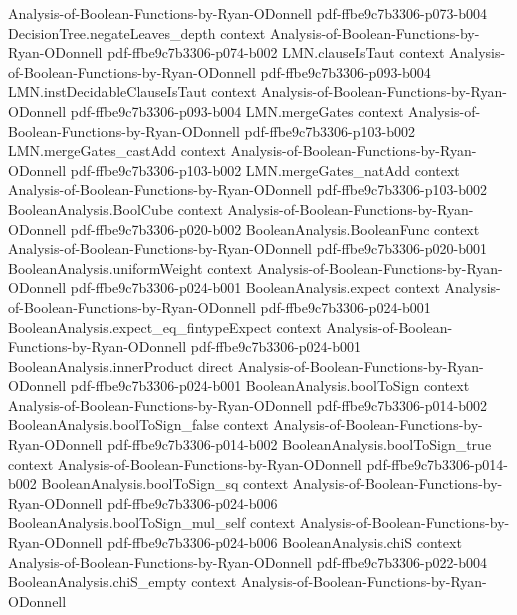 \begin{theorem}
  {Analysis-of-Boolean-Functions-by-Ryan-ODonnell}
  {pdf-ffbe9c7b3306-p073-b004}
\proofstep
  {DecisionTree.negateLeaves_depth}
  {context}
  {Analysis-of-Boolean-Functions-by-Ryan-ODonnell}
  {pdf-ffbe9c7b3306-p074-b002}
\proofstep
  {LMN.clauseIsTaut}
  {context}
  {Analysis-of-Boolean-Functions-by-Ryan-ODonnell}
  {pdf-ffbe9c7b3306-p093-b004}
\proofstep
  {LMN.instDecidableClauseIsTaut}
  {context}
  {Analysis-of-Boolean-Functions-by-Ryan-ODonnell}
  {pdf-ffbe9c7b3306-p093-b004}
\proofstep
  {LMN.mergeGates}
  {context}
  {Analysis-of-Boolean-Functions-by-Ryan-ODonnell}
  {pdf-ffbe9c7b3306-p103-b002}
\proofstep
  {LMN.mergeGates_castAdd}
  {context}
  {Analysis-of-Boolean-Functions-by-Ryan-ODonnell}
  {pdf-ffbe9c7b3306-p103-b002}
\proofstep
  {LMN.mergeGates_natAdd}
  {context}
  {Analysis-of-Boolean-Functions-by-Ryan-ODonnell}
  {pdf-ffbe9c7b3306-p103-b002}
\proofstep
  {BooleanAnalysis.BoolCube}
  {context}
  {Analysis-of-Boolean-Functions-by-Ryan-ODonnell}
  {pdf-ffbe9c7b3306-p020-b002}
\proofstep
  {BooleanAnalysis.BooleanFunc}
  {context}
  {Analysis-of-Boolean-Functions-by-Ryan-ODonnell}
  {pdf-ffbe9c7b3306-p020-b001}
\proofstep
  {BooleanAnalysis.uniformWeight}
  {context}
  {Analysis-of-Boolean-Functions-by-Ryan-ODonnell}
  {pdf-ffbe9c7b3306-p024-b001}
\proofstep
  {BooleanAnalysis.expect}
  {context}
  {Analysis-of-Boolean-Functions-by-Ryan-ODonnell}
  {pdf-ffbe9c7b3306-p024-b001}
\proofstep
  {BooleanAnalysis.expect_eq_fintypeExpect}
  {context}
  {Analysis-of-Boolean-Functions-by-Ryan-ODonnell}
  {pdf-ffbe9c7b3306-p024-b001}
\proofstep
  {BooleanAnalysis.innerProduct}
  {direct}
  {Analysis-of-Boolean-Functions-by-Ryan-ODonnell}
  {pdf-ffbe9c7b3306-p024-b001}
\proofstep
  {BooleanAnalysis.boolToSign}
  {context}
  {Analysis-of-Boolean-Functions-by-Ryan-ODonnell}
  {pdf-ffbe9c7b3306-p014-b002}
\proofstep
  {BooleanAnalysis.boolToSign_false}
  {context}
  {Analysis-of-Boolean-Functions-by-Ryan-ODonnell}
  {pdf-ffbe9c7b3306-p014-b002}
\proofstep
  {BooleanAnalysis.boolToSign_true}
  {context}
  {Analysis-of-Boolean-Functions-by-Ryan-ODonnell}
  {pdf-ffbe9c7b3306-p014-b002}
\proofstep
  {BooleanAnalysis.boolToSign_sq}
  {context}
  {Analysis-of-Boolean-Functions-by-Ryan-ODonnell}
  {pdf-ffbe9c7b3306-p024-b006}
\proofstep
  {BooleanAnalysis.boolToSign_mul_self}
  {context}
  {Analysis-of-Boolean-Functions-by-Ryan-ODonnell}
  {pdf-ffbe9c7b3306-p024-b006}
\proofstep
  {BooleanAnalysis.chiS}
  {context}
  {Analysis-of-Boolean-Functions-by-Ryan-ODonnell}
  {pdf-ffbe9c7b3306-p022-b004}
\proofstep
  {BooleanAnalysis.chiS_empty}
  {context}
  {Analysis-of-Boolean-Functions-by-Ryan-ODonnell}

\end{theorem}
